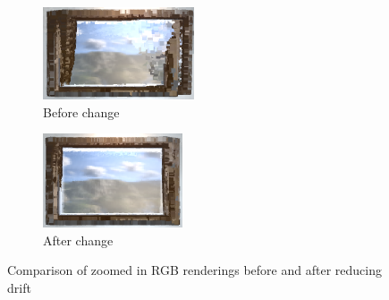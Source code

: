 \documentclass[12pt, a4paper]{article}
\begin{document}
\begin{figure}[H]
  \centering
  \begin{subfigure}[b]{0.45\textwidth}
    \includegraphics[width=\textwidth]{./results/dense_slam/rgb_zoomed.png}
    \caption{Before change}
  \end{subfigure}
  \hfill
  \begin{subfigure}[b]{0.45\textwidth}
    \includegraphics[width=\textwidth]{./results/dense_slam/bonus_rgb_zoomed.png}
    \caption{After change}
  \end{subfigure}
  \caption{Comparison of zoomed in RGB renderings before and after reducing drift}
\end{figure}
\end{document}
